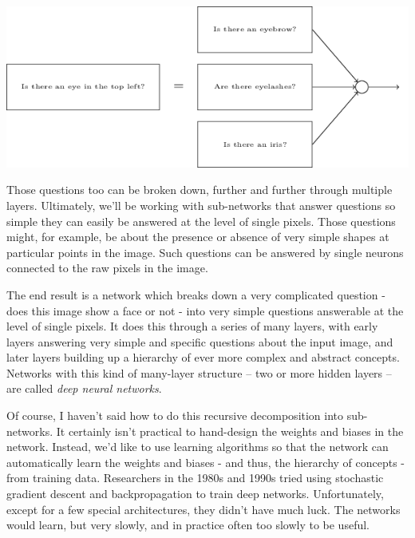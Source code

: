 \documentclass[a4paper,twoside,10pt]{book}
\begin{document}
\begin{center}
	\includegraphics[scale=0.5]{./figures/ch1/tikz15}
\end{center}
Those questions too can be broken down, further and further through multiple layers. Ultimately, we'll be working with sub-networks that answer questions so simple they can easily be answered at the level of single pixels. Those questions might, for example, be about the presence or absence of very simple shapes at particular points in the image. Such questions can be answered by single neurons connected to the raw pixels in the image.

The end result is a network which breaks down a very complicated question - does this image show a face or not - into very simple questions answerable at the level of single pixels. It does this through a series of many layers, with early layers answering very simple and specific questions about the input image, and later layers building up a hierarchy of ever more complex and abstract concepts. Networks with this kind of many-layer structure -- two or more hidden layers -- are called \textit{deep neural networks}.

Of course, I haven't said how to do this recursive decomposition into sub-networks. It certainly isn't practical to hand-design the weights and biases in the network. Instead, we'd like to use learning algorithms so that the network can automatically learn the weights and biases - and thus, the hierarchy of concepts - from training data. Researchers in the 1980s and 1990s tried using stochastic gradient descent and backpropagation to train deep networks. Unfortunately, except for a few special architectures, they didn't have much luck. The networks would learn, but very slowly, and in practice often too slowly to be useful.
\end{document}
